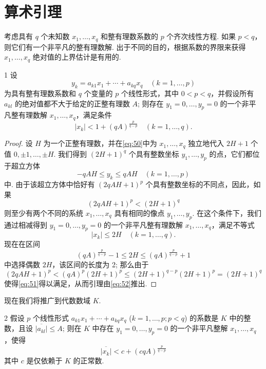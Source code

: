 \section{算术引理}

考虑具有 $q$ 个未知数 $x_1, \ldots, x_q$ 和整有理数系数的 $p$ 个齐次线性方程. 如果 $p < q$，则它们有一个非平凡的整有理数解. 出于不同的目的，根据系数的界限来获得 $x_1, \ldots, x_q$ 绝对值的上界估计是有用的.

\begin{mylemma}{}{1}
设
\begin{equation}
y_k = a_{k1}x_1 + \cdots + a_{kq}x_q \quad (k=1,\ldots,p) \tag{50}\label{eq:50}
\end{equation}
为具有整有理数系数和 $q$ 个变量的 $p$ 个线性形式，其中 $0 < p < q$，并假设所有 $a_{kl}$ 的绝对值都不大于给定的正整有理数 $A$; 则存在 $y_1 = 0, \ldots, y_p = 0$ 的一个非平凡整有理数解 $x_1, \ldots, x_q$，满足条件
\[|x_k| < 1 + (qA)^{\frac{p}{q-p}} \quad (k=1,\ldots,q).\]
\end{mylemma}

\begin{proof}
设 $H$ 为一个正整有理数，并在\eqref{eq:50}中为 $x_1, \ldots, x_q$ 独立地代入 $2H+1$ 个值 $0, \pm 1, \ldots, \pm H$. 我们得到 $(2H+1)^q$ 个具有整数坐标 $y_1, \ldots, y_p$ 的点，它们都位于超立方体
\[-qAH \le y_k \le qAH \quad (k=1,\ldots,p)\]
中. 由于该超立方体中恰好有 $(2qAH + 1)^p$ 个具有整数坐标的不同点，因此，如果
\begin{equation}
(2qAH+1)^p < (2H+1)^q \tag{51}\label{eq:51}
\end{equation}
则至少有两个不同的系统 $x_1, \dots, x_q$ 具有相同的像点 $y_1, \dots, y_p$. 在这个条件下，我们通过相减得到 $y_1 = 0, \dots, y_p = 0$ 的一个非平凡整有理数解 $x_1, \dots, x_q$，满足不等式
\begin{equation}
|x_k| \le 2H \quad (k=1,\ldots,q). \tag{52}\label{eq:52}
\end{equation}
现在在区间
\[(qA)^{\frac{p}{q-p}} - 1 \le 2H \le (qA)^{\frac{p}{q-p}} + 1\]
中选择偶数 $2H$，该区间的长度为 2; 那么由于
\[(2qAH+1)^p < (qA)^p (2H+1)^p \le (2H+1)^{q-p}(2H+1)^p = (2H+1)^q\]
使得\eqref{eq:51}得以满足，从而引理由\eqref{eq:52}推出.
\end{proof}

现在我们将推广到代数数域 $K$.

\begin{mylemma}{}{2}
假设 $p$ 个线性形式 $a_{k1}x_1 + \cdots + a_{kq}x_q$ ($k=1, \ldots, p; p < q$) 的系数是 $K$ 中的整数，且设 $\overline{|a_{kl}|} \le A$; 则在 $K$ 中存在 $y_1 = 0, \ldots, y_p = 0$ 的一个非平凡整解 $x_1, \ldots, x_q$，使得
\begin{equation}
\overline{|x_k|} < c + (c q A)^{\frac{p}{q-p}} \tag{53}\label{eq:53}
\end{equation}
其中 $c$ 是仅依赖于 $K$ 的正常数.
\end{mylemma}

